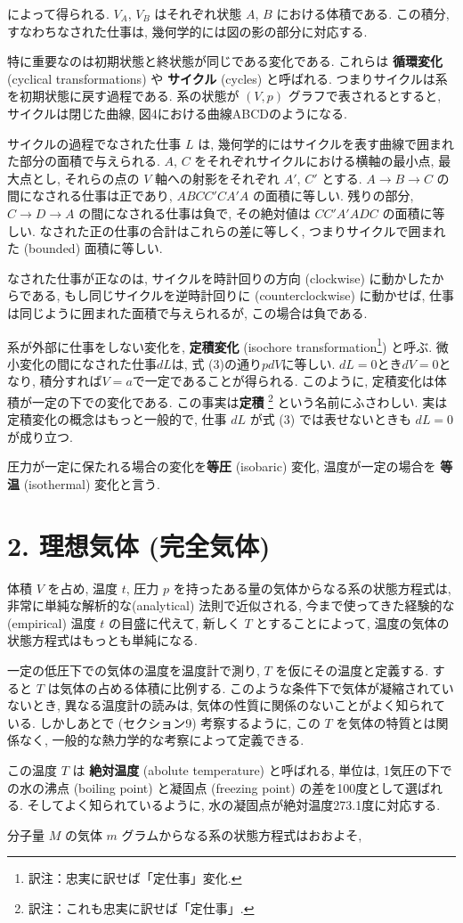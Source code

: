 によって得られる. $V_{A}$, $V_{B}$ はそれぞれ状態 $A$, $B$ における体積である. この積分, すなわちなされた仕事は, 幾何学的には図の影の部分に対応する. \par
特に重要なのは初期状態と終状態が同じである変化である. これらは \textbf{循環変化} (cyclical transformations) や \textbf{サイクル} (cycles) と呼ばれる. つまりサイクルは系を初期状態に戻す過程である. 系の状態が $(V, p)$ グラフで表されるとすると, サイクルは閉じた曲線, 図4における曲線ABCDのようになる. \par
サイクルの過程でなされた仕事 $L$ は, 幾何学的にはサイクルを表す曲線で囲まれた部分の面積で与えられる. $A$, $C$ をそれぞれサイクルにおける横軸の最小点, 最大点とし, それらの点の $V$ 軸への射影をそれぞれ $A'$, $C'$ とする. $A \to B \to C$ の間になされる仕事は正であり, $ABCC'CA'A$ の面積に等しい. 残りの部分, $C \to D \to A$ の間になされる仕事は負で, その絶対値は $CC'A'ADC$ の面積に等しい. なされた正の仕事の合計はこれらの差に等しく, つまりサイクルで囲まれた (bounded) 面積に等しい. \par
なされた仕事が正なのは, サイクルを時計回りの方向 (clockwise) に動かしたからである, もし同じサイクルを逆時計回りに (counterclockwise) に動かせば, 仕事は同じように囲まれた面積で与えられるが, この場合は負である. \par
系が外部に仕事をしない変化を, \textbf{定積変化} (isochore transformation\footnote{訳注：忠実に訳せば「定仕事」変化. }) と呼ぶ. 微小変化の間になされた仕事$dL$は, 式 (3)の通り$pdV$に等しい. $dL=0$とき$dV=0$となり, 積分すれば$V=a$で一定であることが得られる. このように, 定積変化は体積が一定の下での変化である. この事実は{\bf 定積} \footnote{訳注：これも忠実に訳せば「定仕事」. } という名前にふさわしい. 実は定積変化の概念はもっと一般的で, 仕事 $dL$ が式 (3) では表せないときも $dL=0$ が成り立つ. \par
圧力が一定に保たれる場合の変化を\textbf{等圧} (isobaric) 変化, 温度が一定の場合を \textbf{等温} (isothermal) 変化と言う.

\section*{2. 理想気体 (完全気体)}
体積 $V$ を占め, 温度 $t$, 圧力 $p$ を持ったある量の気体からなる系の状態方程式は, 非常に単純な解析的な(analytical) 法則で近似される, 今まで使ってきた経験的な (empirical) 温度 $t$ の目盛に代えて, 新しく $T$ とすることによって, 温度の気体の状態方程式はもっとも単純になる. \par
一定の低圧下での気体の温度を温度計で測り, $T$ を仮にその温度と定義する. すると $T$ は気体の占める体積に比例する. このような条件下で気体が凝縮されていないとき, 異なる温度計の読みは, 気体の性質に関係のないことがよく知られている. しかしあとで (セクション9) 考察するように, この $T$ を気体の特質とは関係なく, 一般的な熱力学的な考察によって定義できる. \par
この温度 $T$ は \textbf{絶対温度} (abolute temperature) と呼ばれる, 単位は, 1気圧の下での水の沸点 (boiling point) と凝固点 (freezing point) の差を100度として選ばれる. そしてよく知られているように, 水の凝固点が絶対温度273.1度に対応する. \par
分子量 $M$ の気体 $m$ グラムからなる系の状態方程式はおおよそ, 

